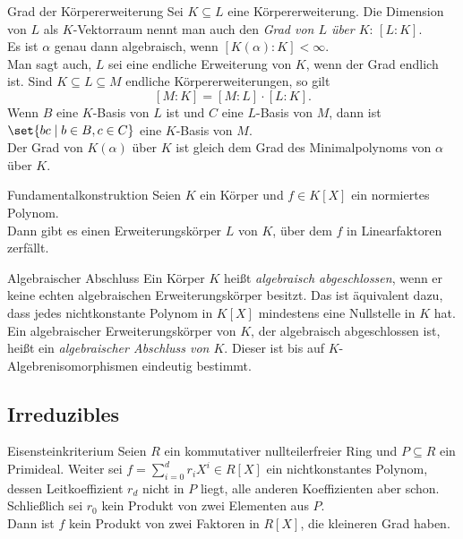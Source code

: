 \begin{karte}{Grad der Körpererweiterung}
    Sei \(K \subseteq L\) eine Körpererweiterung. Die Dimension 
    von \(L\) als \(K\)-Vektorraum nennt man auch den 
    \textit{Grad von \(L\) über \(K\)}: \([L:K]\).\\
    Es ist \(\alpha\) genau dann algebraisch, wenn 
    \([K(\alpha) : K] < \infty\).\\
    Man sagt auch, \(L\) sei eine endliche Erweiterung von \(K\), 
    wenn der Grad endlich ist. Sind \( K \subseteq L \subseteq M \) 
    endliche Körpererweiterungen, so gilt 
    \[ [M:K] = [M:L] \cdot [L:K]. \]
    Wenn \(B\) eine \(K\)-Basis von \(L\) ist und \(C\) 
    eine \(L\)-Basis von \(M\), dann ist \( \set{bc \;|\; b\in B, c\in C} \) 
    eine \(K\)-Basis von \(M\).\\
    Der Grad von \(K(\alpha)\) über \(K\) ist gleich dem Grad des Minimalpolynoms 
    von \(\alpha\) über \(K\). 
\end{karte}

\begin{karte}{Fundamentalkonstruktion}
    Seien \(K\) ein Körper und \(f\in K[X]\) ein normiertes Polynom. \\
    Dann gibt es einen Erweiterungskörper \(L\) von \(K\), über dem \(f\) 
    in Linearfaktoren zerfällt.
\end{karte}

\begin{karte}{Algebraischer Abschluss}
    Ein Körper \(K\) heißt \textit{algebraisch abgeschlossen}, 
    wenn er keine echten algebraischen Erweiterungskörper besitzt. 
    Das ist äquivalent dazu, dass jedes nichtkonstante Polynom 
    in \(K[X]\) mindestens eine Nullstelle in \(K\) hat. \\
    Ein algebraischer Erweiterungskörper von \(K\), der algebraisch 
    abgeschlossen ist, heißt ein \textit{algebraischer Abschluss von \(K\)}. 
    Dieser ist bis auf \(K\)-Algebrenisomorphismen eindeutig bestimmt.
\end{karte}

\subsection{Irreduzibles}

\begin{karte}{Eisensteinkriterium}
    Seien \(R\) ein kommutativer nullteilerfreier Ring und \(P \subseteq R\) 
    ein Primideal. Weiter sei \( f = \sum_{i=0}^d r_i X^i \in R[X] \) 
    ein nichtkonstantes Polynom, dessen Leitkoeffizient 
    \(r_d\) nicht in \(P\) liegt, alle anderen Koeffizienten 
    aber schon. Schließlich sei \(r_0\) kein Produkt von zwei Elementen 
    aus \(P\).\\
    Dann ist \(f\) kein Produkt von zwei Faktoren in \(R[X]\), 
    die kleineren Grad haben.
\end{karte}

